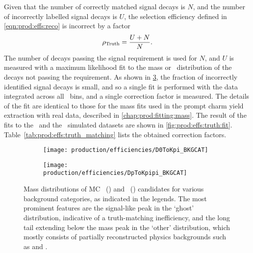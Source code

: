 Given that the number of correctly matched signal decays is $N$, and the number 
of incorrectly labelled signal decays is $U$, the selection efficiency defined 
in \cref{eqn:prod:effs:reco} is incorrect by a factor
\begin{equation}
  \rho_{\textnormal{Truth}} = \frac{U+N}{N}.
  \label{eqn:prod:effs:truth}
\end{equation}
The number of decays passing the signal requirement is used for $N$, and $U$ is 
measured with a maximum likelihood fit to the mass or \deltam\ distribution of 
the decays not passing the requirement.
As shown in \cref{fig:prod:effs:truth:categories}, the fraction of incorrectly 
identified signal decays is small, and so a single fit is performed with the 
data integrated across all \pTy\ bins, and a single correction factor is 
measured.
The details of the fit are identical to those for the mass fits used in the 
prompt charm yield extraction with real data, described in 
\cref{chap:prod:fitting:mass}.
The result of the fits to the \DzToKpi\ and the \DpToKpipi\ simulated datasets 
are shown in \cref{fig:prod:effs:truth:fit}.
Table~\ref{tab:prod:effs:truth_matching} lists the obtained correction factors.

\begin{figure}
  \begin{subfigure}[b]{0.5\textwidth}
    \centering
    \texttt{[image: production/efficiencies/D0ToKpi\_BKGCAT]}
    \caption{\PDzero}
    \label{fig:prod:effs:truth:categories:D0ToKpi}
  \end{subfigure}
  \begin{subfigure}[b]{0.5\textwidth}
    \centering
    \texttt{[image: production/efficiencies/DpToKpipi\_BKGCAT]}
    \caption{\PDplus}
    \label{fig:prod:effs:truth:categories:DpToKpipi}
  \end{subfigure}
  \caption{%
    Mass distributions of \ac{MC} 
    \PDzero~() and 
    \PDplus~() candidates for 
    various background categories, as indicated in the legends.
    The most prominent features are the signal-like peak in the `ghost' 
    distribution, indicative of a truth-matching inefficiency, and the long 
    tail extending below the mass peak in the `other' distribution, which 
    mostly consists of partially reconstructed physics backgrounds such as 
    \decay{\PDzero}{\PKminus\Ppiplus\Ppizero} and 
    \decay{\PDplus}{\PKminus\Ppiplus\Ppiplus\Ppizero}.
  }
  \label{fig:prod:effs:truth:categories}
\end{figure}

